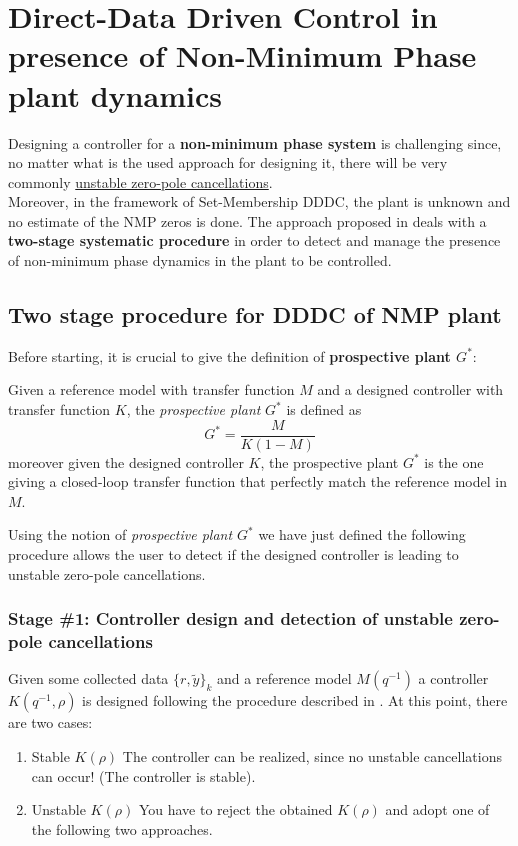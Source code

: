 \chapter[DDDC with NMP plant dynamics]{Direct-Data Driven Control in presence of Non-Minimum Phase plant dynamics}

Designing a controller for a \textbf{non-minimum phase system} is challenging since, no matter what is the used approach for designing it, there will be very commonly \underline{unstable zero-pole cancellations}.\\
Moreover, in the framework of Set-Membership DDDC, the plant is unknown and no estimate of the NMP zeros is done. The approach proposed in \citeauthor{cerone2017_NMP} \cite{cerone2017_NMP} deals with a \textbf{two-stage systematic procedure} in order to detect and manage the presence of non-minimum phase dynamics in the plant to be controlled. 

\section{Two stage procedure for DDDC of NMP plant}
Before starting, it is crucial to give the definition of \textbf{prospective plant $G^*$}:
\begin{definition}
    Given a reference model with transfer function $M$ and a designed controller with transfer function $K$, the \textit{prospective plant} $G^*$  is defined as 
    \begin{equation}
        G^*=\frac{M}{K(1-M)}
    \end{equation}
    moreover given the designed controller $K$, the prospective plant $G^*$ is the one giving a closed-loop transfer function that perfectly match the reference model in $M$.
\end{definition}

Using the notion of \textit{prospective plant $G^*$} we have just defined the following procedure allows the user to detect if the designed controller is leading to unstable zero-pole cancellations.

\subsection{Stage \#1: Controller design and detection of unstable zero-pole cancellations}
Given some collected data $\{r,\tilde{y}\}_k$ and a reference model $M(q^{-1})$ a controller $K(q^{-1},\rho)$ is designed following the procedure described in . At this point, there are two cases:
\begin{enumerate}
    \itemsep-0.3em
    \item \textsf{Stable $K(\rho)$} The controller can be realized, since no unstable cancellations can occur! (The controller is stable).
    \item \textsf{Unstable $K(\rho)$} You have to reject the obtained $K(\rho)$ and adopt one of the following two approaches.
\end{enumerate}

